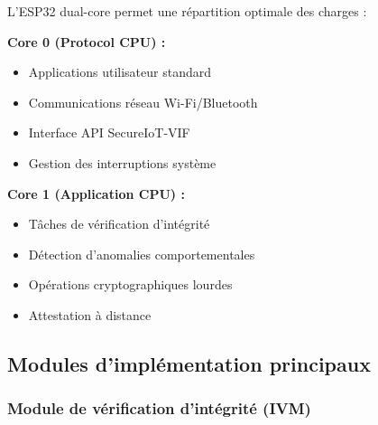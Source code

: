 L'ESP32 dual-core permet une répartition optimale des charges :

\textbf{Core 0 (Protocol CPU) :}
\begin{itemize}
    \item Applications utilisateur standard
    \item Communications réseau Wi-Fi/Bluetooth
    \item Interface API SecureIoT-VIF
    \item Gestion des interruptions système
\end{itemize}

\textbf{Core 1 (Application CPU) :}
\begin{itemize}
    \item Tâches de vérification d'intégrité
    \item Détection d'anomalies comportementales
    \item Opérations cryptographiques lourdes
    \item Attestation à distance
\end{itemize}

\subsection{Modules d'implémentation principaux}

\subsubsection{Module de vérification d'intégrité (IVM)}

